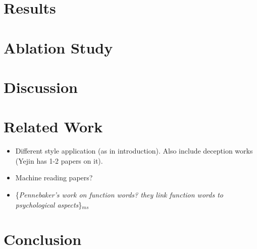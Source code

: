 \documentclass[11pt,a4paper]{article}
\newcommand{\isection}[2]{\section{#1}\label{ssec:#2}}
\newcommand{\isectionb}[1]{\section{#1}\label{ssec:#1}}
\newcommand{\ms}[1]{{\color{cyan}\{\textit{#1}\}$_{ms}$}}
\begin{document}
\isectionb{Results}

\isection{Ablation Study}{Ablation}

\isectionb{Discussion}

\isection{Related Work}{Related}

\begin{itemize}
\item Different style application (as in introduction). Also include deception works (Yejin has 1-2 papers on it). 
\item Machine reading papers? 
\item \ms{Pennebaker's work on function words? they link function words to psychological aspects}
\end{itemize}


\isectionb{Conclusion}




%
%

\newpage


\end{document}
